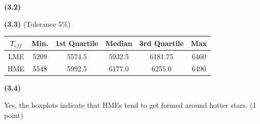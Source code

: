 \noindent\textbf{(3.2)}

\noindent\textbf{(3.3)} (Tolerance 5\%)

\begin{center}
\begin{tabular}{cccccc}
\toprule
$T_{eff}$ & Min. & 1st Quartile & Median & 3rd Quartile & Max\\
\midrule
LME & 5209 & 5574.5 & 5932.5 & 6181.75 & 6460\\
HME & 5548 & 5992.5 & 6177.0 & 6255.0 & 6490\\
\bottomrule
\end{tabular}
\end{center}

\noindent\textbf{(3.4)}

Yes, the boxplots indicate that HMEs tend to get formed around hotter stars.
\hfill(1 point)

